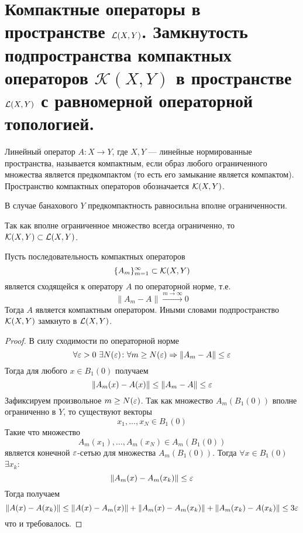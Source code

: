 \newpage
\section{Компактные операторы в пространстве $\mathcal{L}(X,Y)$. Замкнутость подпространства компактных операторов $\mathcal{K}(X,Y)$ в пространстве $\mathcal{L}(X,Y)$ с равномерной операторной топологией.}
\begin{definition}
	Линейный оператор $A \colon X \to Y$, где $X,Y$ --- линейные нормированные пространства, называется компактным, если образ любого ограниченного множества является предкомпактом (то есть его замыкание является компактом). Пространство компактных операторов обозначается $\mathcal{K}(X,Y)$.
\end{definition}
\begin{definition}
	В случае банахового $Y$ предкомпактность равносильна вполне ограниченности. 
\end{definition}
Так как вполне ограниченное множество всегда ограниченно, то $\mathcal{K}(X,Y) \subset \mathcal{L}(X,Y)$.
\begin{claim}
	Пусть последовательность компактных операторов 
	$$
	\{A_m\}_{m=1}^\infty \subset \mathcal{K}(X,Y)
	$$
	является сходящейся к оператору $A$ по операторной норме, т.е. 
	$$
	\|A_m - A\| \xrightarrow{m \to \infty} 0 
	$$
	Тогда $A$ является компактным оператором. Иными словами подпространство $\mathcal{K}(X,Y)$ замкнуто в $\mathcal{L}(X,Y)$.
\end{claim}
\begin{proof}
	В силу сходимости по операторной норме
	$$
	\forall \varepsilon > 0 \ \exists N(\varepsilon) \colon \forall m \geq N(\varepsilon) \Rightarrow \|A_m - A\| \leq \varepsilon
	$$
	Тогда для любого $x \in B_1(0)$ получаем 
	$$
	\|A_m(x) - A(x)\| \leq \|A_m - A\| \leq \varepsilon 
	$$
	Зафиксируем произвольное $m \geq N(\varepsilon)$. Так как множество $A_m(B_1(0))$ вполне ограниченно в $Y$, то существуют векторы 
	$$
	x_1, \dots, x_N \in B_1(0)
	$$
	Такие что множество 
	$$
	A_m(x_1), \dots, A_m(x_N) \in A_m(B_1(0))
	$$
	является конечной $\varepsilon$-сетью для множества $A_m(B_1(0))$. Тогда $\forall x \in B_1(0)$ $\exists x_k$:
	$$
	\|A_m(x) - A_m(x_k)\| \leq \varepsilon
	$$ 
	Тогда получаем 
	$$
	\|A(x) - A(x_k)\| \leq \|A(x) - A_m(x)\| + \|A_m(x) - A_m(x_k)\| + \|A_m(x_k) - A(x_k)\| \leq 3\varepsilon 
	$$
	что и требовалось.
\end{proof}